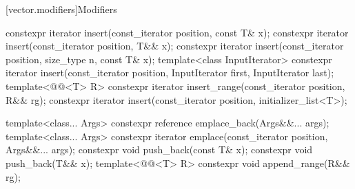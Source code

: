 \documentclass{wg21}
\begin{document}
[vector.modifiers]{Modifiers}

%
\begin{itemdecl}
constexpr iterator insert(const_iterator position, const T& x);
constexpr iterator insert(const_iterator position, T&& x);
constexpr iterator insert(const_iterator position, size_type n, const T& x);
template<class InputIterator>
constexpr iterator insert(const_iterator position, InputIterator first, InputIterator last);
template<@@<T> R>
constexpr iterator insert_range(const_iterator position, R&& rg);
constexpr iterator insert(const_iterator position, initializer_list<T>);

template<class... Args> constexpr reference emplace_back(Args&&... args);
template<class... Args> constexpr iterator emplace(const_iterator position, Args&&... args);
constexpr void push_back(const T& x);
constexpr void push_back(T&& x);
template<@@<T> R>
constexpr void append_range(R&& rg);
\end{itemdecl}
\end{document}
